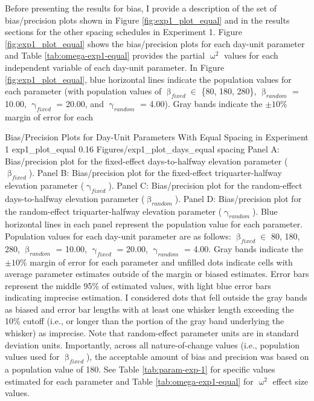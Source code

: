 \documentclass[
12pt, %
twoside,
english]{guelphthesis}
\begin{document}
Before presenting the results for bias, I provide a description of the set of bias/precision plots shown in Figure \ref{fig:exp1_plot_equal} and in the results sections for the other spacing schedules in Experiment 1. Figure \ref{fig:exp1_plot_equal} shows the bias/precision plots for each day-unit parameter and Table \ref{tab:omega-exp1-equal} provides the partial \(\upomega^2\) values for each independent variable of each day-unit parameter. In Figure \ref{fig:exp1_plot_equal}, blue horizontal lines indicate the population values for each parameter (with population values of \(\upbeta_{fixed} \in\) \{80, 180, 280\}, \(\upbeta_{random}\) = 10.00, \(\upgamma_{fixed}\) = 20.00, and \(\upgamma_{random}\) = 4.00). Gray bands indicate the \(\pm 10\%\) margin of error for each
\begin{apaFigure}
[portrait]
[samepage]
[0cm]
{Bias/Precision Plots for Day-Unit Parameters With Equal Spacing in Experiment 1}
{exp1_plot_equal}
{0.16}
{Figures/exp1_plot_days_equal spacing}
{Panel A: Bias/precision plot for the fixed-effect days-to-halfway elevation parameter ($\upbeta_{fixed}$). Panel B: Bias/precision plot for the fixed-effect triquarter-halfway elevation parameter ($\upgamma_{fixed}$). Panel C: Bias/precision plot for the random-effect days-to-halfway elevation parameter ($\upbeta_{random}$). Panel D: Bias/precision plot for the random-effect triquarter-halfway elevation parameter ($\upgamma_{random}$). Blue horizontal lines in each panel represent the population value for each parameter. Population values for each day-unit parameter are as follows: $\upbeta_{fixed} \in$ {80, 180, 280}, $\upbeta_{random}$ = 10.00, $\upgamma_{fixed}$ = 20.00, $\upgamma_{random}$ = 4.00. Gray bands indicate the $\pm 10\%$ margin of error for each parameter and unfilled dots indicate cells with average parameter estimates outside of the margin or biased estimates. Error bars represent the middle 95\% of estimated values, with light blue error bars indicating imprecise estimation. I considered dots that fell outside the gray bands as biased and error bar lengths with at least one whisker length exceeding the 10\% cutoff (i.e., or longer than the portion of the gray band underlying the whisker) as imprecise. Note that random-effect parameter units are in standard deviation units. Importantly, across all nature-of-change values (i.e., population values used for $\upbeta_{fixed}$), the acceptable amount of bias and precision was based on a population value of 180. See Table \ref{tab:param-exp-1} for specific values estimated for each parameter and Table \ref{tab:omega-exp1-equal} for $\upomega^2$ effect size values.}
\end{apaFigure}
\end{document}
